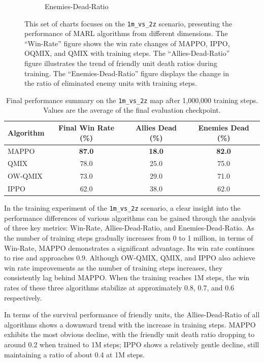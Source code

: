 \begin{figure}[ht!]
\begin{subfigure}[b]{0.32\textwidth}
        \caption{Enemies-Dead-Ratio}
        \label{fig:enemies_dead_2m}
    \end{subfigure}
    \caption{This set of charts focuses on the \texttt{1m\_vs\_2z} scenario, presenting the performance of MARL algorithms from different dimensions. The ``Win-Rate'' figure shows the win rate changes of MAPPO, IPPO, OQMIX, and QMIX with training steps. The ``Allies-Dead-Ratio'' figure illustrates the trend of friendly unit death ratios during training. The ``Enemies-Dead-Ratio'' figure displays the change in the ratio of eliminated enemy units with training steps.}
    \label{fig:results_1m_vs_2z}
\end{figure}

\begin{table}[ht]
\centering
\caption{Final performance summary on the \texttt{1m\_vs\_2z} map after 1,000,000 training steps. Values are the average of the final evaluation checkpoint.}
\label{tab:results_1m_vs_2z}
\begin{tabular}{lccc}
\toprule
\textbf{Algorithm} & \textbf{Final Win Rate (\%)} & \textbf{Allies Dead (\%)} & \textbf{Enemies Dead (\%)} \\
\midrule
MAPPO & \textbf{87.0} & \textbf{18.0} & \textbf{82.0} \\
QMIX & 78.0 & 25.0 & 75.0 \\
OW-QMIX  & 73.0 & 29.0 & 71.0 \\
IPPO  & 62.0 & 38.0 & 62.0 \\
\bottomrule
\end{tabular}
\end{table}

In the training experiment of the \texttt{1m\_vs\_2z} scenario, a clear insight into the performance differences of various algorithms can be gained through the analysis of three key metrics: Win-Rate, Allies-Dead-Ratio, and Enemies-Dead-Ratio. As the number of training steps gradually increases from 0 to 1 million, in terms of Win-Rate, MAPPO demonstrates a significant advantage. Its win rate continues to rise and approaches 0.9. Although OW-QMIX, QMIX, and IPPO also achieve win rate improvements as the number of training steps increases, they consistently lag behind MAPPO. When the training reaches 1M steps, the win rates of these three algorithms stabilize at approximately 0.8, 0.7, and 0.6 respectively.

In terms of the survival performance of friendly units, the Allies-Dead-Ratio of all algorithms shows a downward trend with the increase in training steps. MAPPO exhibits the most obvious decline, with the friendly unit death ratio dropping to around 0.2 when trained to 1M steps; IPPO shows a relatively gentle decline, still maintaining a ratio of about 0.4 at 1M steps.

